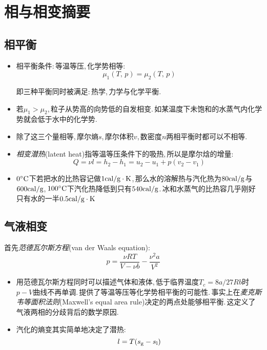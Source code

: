 \chapter{相与相变摘要}


\section{相平衡}

\begin{itemize}
	\item 相平衡条件:\,等温等压,\,化学势相等:\,
	\[\mu_1(T,\,p)=\mu_2(T,\,p)\]

	即三种平衡同时被满足:\,热学,\,力学与化学平衡.

	\item 若$\mu_1>\mu_2$,\,粒子从势高的向势低的自发相变.\,如某温度下未饱和的水蒸气内化学势就会低于水中的化学势.

	\item 除了这三个量相等,\,摩尔熵$s$,\,摩尔体积$v$,\,数密度$n$两相平衡时都可以不相等.

	\item \emph{相变潜热}(latent heat)指等温等压条件下的吸热,\,所以是摩尔焓的增量:
	\[Q=\nu l=h_2-h_1=u_2-u_1+p(v_2-v_1)\]

	\item $0^\circ \mathrm{C}$下若把水的比热容记做$1{\rm cal/g\cdot K}$,\,那么水的溶解热与汽化热为$80{\rm cal/g}$与$600{\rm cal/g}$,\,$100^\circ \mathrm{C}$下汽化热降低到只有$540{\rm cal/g}$.\,冰和水蒸气的比热容几乎刚好只有水的一半$0.5{\rm cal/g\cdot K}$
\end{itemize}

\section{气液相变}
首先\emph{范德瓦尔斯方程}(van der Waals equation):
\[p=\frac{\nu RT}{V-\nu b}-\frac{\nu^2 a}{V^2}\]
\begin{itemize}
	\item 用范德瓦尔斯方程同时可以描述气体和液体,\,低于临界温度$T_c=8a/27Rb$时$p-V$曲线不再单调.\,提供了等温等压等化学势相平衡的可能性.\,事实上在\emph{麦克斯韦等面积法则}(Maxwell's equal area rule)决定的两点处能够相平衡.\,这定义了气液两相的分歧背后的数学原因.
	\item 汽化的熵变其实简单地决定了潜热:
	\[l=T(s_{\rm g}-s_{\rm l})\]
	\end{itemize}

